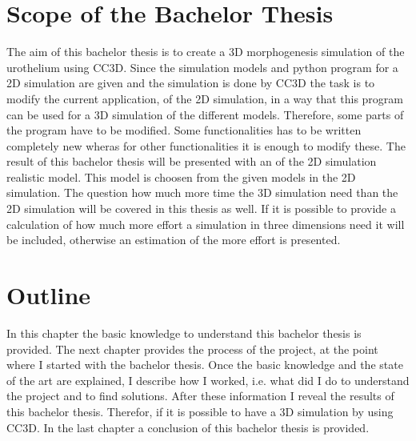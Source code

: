 \section{Scope of the Bachelor Thesis}
The aim of this bachelor thesis is to create a 3D morphogenesis simulation of the urothelium using \ac{CC3D}. Since the simulation models and python program for a 2D simulation are given and the simulation is done by \ac{CC3D} the task is to modify the current application, of the 2D simulation, in a way that this program can be used for a 3D simulation of the different models. \newline
Therefore, some parts of the program have to be modified. Some functionalities has to be written completely new wheras for other functionalities it is enough to modify these. \newline
The result of this bachelor thesis will be presented with an of the 2D simulation realistic model. This model is choosen from the given models in the 2D simulation. The question how much more time the 3D simulation need than the 2D simulation will be covered in this thesis as well. If it is possible to provide a calculation of how much more effort a simulation in three dimensions need it will be included, otherwise an estimation of the more effort is presented.


\section{Outline}
In this chapter the basic knowledge to understand this bachelor thesis is provided. The next chapter provides the process of the project, at the point where I started with the bachelor thesis. Once the basic knowledge and the state of the art are explained, I describe how I worked, i.e. what did I do to understand the project and to find solutions. After these information I reveal the results of this bachelor thesis. Therefor, if it is possible to have a 3D simulation by using \ac{CC3D}. In the last chapter a conclusion of this bachelor thesis is provided.